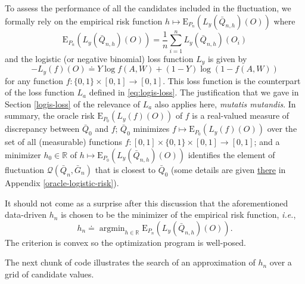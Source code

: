 \documentclass[11pt,openright,twoside]{book}
\newcommand{\bbR}{\mathbb{R}}
\newcommand{\defq}{\doteq}
\newcommand{\calQ}{\mathcal{Q}}
\newcommand{\Exp}{\textrm{E}}
\newcommand{\Gbar}{\bar{G}}
\newcommand{\Qbar}{\bar{Q}}
\theoremstyle{definition}
\theoremstyle{definition}
\theoremstyle{definition}
\theoremstyle{remark}
\begin{document}
To assess the performance of all the candidates included in the fluctuation,
we formally rely on the empirical risk function \(h \mapsto \Exp_{P_{n}} \left(L_{y} (\Qbar_{n,h})(O)\right)\) where \begin{equation*}\Exp_{P_{n}}
\left(L_{y}   (\Qbar_{n,h})(O)\right)  =   \frac{1}{n}  \sum_{i=1}^{n}   L_{y}
(\Qbar_{n,h})(O_{i})\end{equation*} and the logistic (or negative binomial)
loss function \(L_{y}\) is given by
\begin{equation*} 
-L_{y}(f)(O) \defq Y
\log f(A,W) + (1 - Y) \log \left(1 - f(A,W)\right) \label{eq:logis-loss-y}
\end{equation*}
for any function \(f:\{0,1\} \times [0,1] \to [0,1]\). This loss
function is the counterpart of the loss function \(L_{a}\) defined in
\eqref{eq:logis-loss}. The justification that we gave in Section
\ref{logis-loss} of the relevance of \(L_{a}\) also applies here, \emph{mutatis
mutandis}. In summary, the oracle risk \(\Exp_{P_{0}} \left(L_{y} (f)(O)\right)\) of \(f\) is a real-valued measure of discrepancy between
\(\Qbar_{0}\) and \(f\); \(\Qbar_{0}\) minimizes \(f \mapsto \Exp_{P_{0}} \left(L_{y} (f)(O)\right)\) over the set of all (measurable) functions \(f:[0,1] \times \{0,1\} \times [0,1] \to [0,1]\); and a minimizer \(h_{0} \in \bbR\) of \(h \mapsto \Exp_{P_{0}} \left(L_{y} (\Qbar_{n,h})(O)\right)\) identifies the
element of fluctuation \(\calQ(\Qbar_{n}, \Gbar_{n})\) that is closest to
\(\Qbar_{0}\) (some details are given \protect\hyperlink{oracle-logistic-risk}{there} in Appendix
\ref{oracle-logistic-risk}).

It should not come as a surprise after this discussion that the aforementioned
data-driven \(h_{n}\) is chosen to be the minimizer of the empirical risk
function, \emph{i.e.}, \begin{equation*}h_{n} \defq  \mathop{\arg\min}_{h \in
\bbR}  \Exp_{P_{n}}  \left(L_{y}  (\Qbar_{n,h})(O)\right).\end{equation*} The
criterion is convex so the optimization program is well-posed.

The next chunk of code illustrates the search of an approximation of \(h_{n}\)
over a grid of candidate values.
\end{document}
